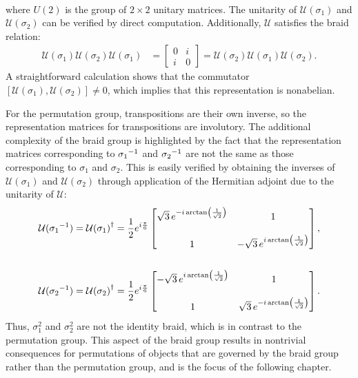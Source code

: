 \begin{example}
\begin{align}
\begin{split}
        \end{split}
    \end{align}
    where $U(2)$ is the group of $2\times 2$ unitary matrices. The unitarity of $\mathcal{U}(\sigma_1)$ and $\mathcal{U}(\sigma_2)$ can be verified by direct computation. Additionally, $\mathcal{U}$ satisfies the braid relation:
    \begin{align}
        \mathcal{U}(\sigma_1)\mathcal{U}(\sigma_2)\mathcal{U}(\sigma_1) &= \begin{bmatrix}
            0 & i \\
            i & 0
        \end{bmatrix} = \mathcal{U}(\sigma_2)\mathcal{U}(\sigma_1)\mathcal{U}(\sigma_2).
    \end{align}
    A straightforward calculation shows that the commutator $[\mathcal{U}(\sigma_1),\mathcal{U}(\sigma_2)]\neq0$, which implies that this representation is nonabelian.
    
    For the permutation group, transpositions are their own inverse, so the representation matrices for transpositions are involutory. The additional complexity of the braid group is highlighted by the fact that the representation matrices corresponding to ${ \sigma_1 }^{-1}$ and ${ \sigma_2 }^{-1}$ are not the same as those corresponding to $\sigma_1$ and $\sigma_2$. This is easily verified by obtaining the inverses of $\mathcal{U}(\sigma_1)$ and $\mathcal{U}(\sigma_2)$ through application of the Hermitian adjoint due to the unitarity of $\mathcal{U}$:
    \begin{align}
        \mathcal{U}({ \sigma_1 }^{-1}) &= {\mathcal{U}(\sigma_1)}^\dagger = \frac{1}{2}e^{i\frac{\pi}{6}}\begin{bmatrix}
            \sqrt{3}\,e^{-i\arctan\left( \frac{1}{\sqrt{2}} \right)} & 1 \\
            \\
            1 & -\sqrt{3}\,e^{i\arctan\left( \frac{1}{\sqrt{2}} \right)}
        \end{bmatrix}, \\ 
        \nonumber\\
        \mathcal{U}({ \sigma_2 }^{-1}) &= {\mathcal{U}(\sigma_2)}^\dagger = \frac{1}{2}e^{i\frac{\pi}{6}}\begin{bmatrix}
            -\sqrt{3}\,e^{i\arctan\left( \frac{1}{\sqrt{2}} \right)} & 1 \\
            \\
            1 & \sqrt{3}\,e^{-i\arctan\left( \frac{1}{\sqrt{2}} \right)}
        \end{bmatrix}.
    \end{align}
    Thus, $\sigma_1^2$ and $\sigma_2^2$ are not the identity braid, which is in contrast to the permutation group. This aspect of the braid group results in nontrivial consequences for permutations of objects that are governed by the braid group rather than the permutation group, and is the focus of the following chapter.
\end{example}